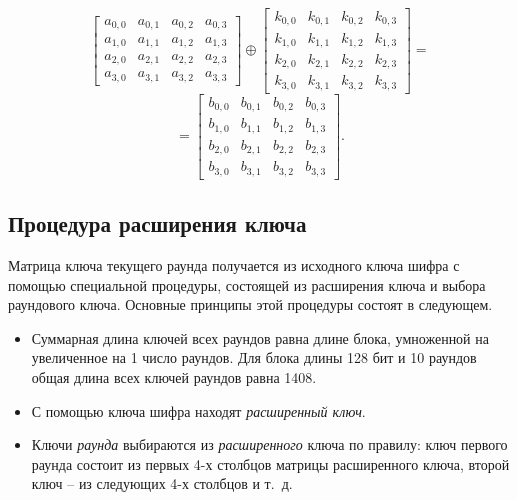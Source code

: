 \[
    \left[ \begin{array}{cccc}
        a_{0,0} & a_{0,1} & a_{0,2} & a_{0,3} \\
        a_{1,0} & a_{1,1} & a_{1,2} & a_{1,3} \\
        a_{2,0} & a_{2,1} & a_{2,2} & a_{2,3} \\
        a_{3,0} & a_{3,1} & a_{3,2} & a_{3,3}
    \end{array} \right]
    \oplus
    \left[ \begin{array}{cccc}
        k_{0,0} & k_{0,1} & k_{0,2} & k_{0,3} \\
        k_{1,0} & k_{1,1} & k_{1,2} & k_{1,3} \\
        k_{2,0} & k_{2,1} & k_{2,2} & k_{2,3} \\
        k_{3,0} & k_{3,1} & k_{3,2} & k_{3,3}
    \end{array} \right] =
\] \[
    = \left[ \begin{array}{cccc}
        b_{0,0} & b_{0,1} & b_{0,2} & b_{0,3} \\
        b_{1,0} & b_{1,1} & b_{1,2} & b_{1,3} \\
        b_{2,0} & b_{2,1} & b_{2,2} & b_{2,3} \\
        b_{3,0} & b_{3,1} & b_{3,2} & b_{3,3}
    \end{array} \right].
\]


\subsection{Процедура расширения ключа}

Матрица ключа текущего раунда получается из исходного ключа шифра с помощью специальной процедуры, состоящей из расширения ключа и выбора раундового ключа. Основные принципы этой процедуры состоят в следующем.
\begin{itemize}
    \item Суммарная длина ключей всех раундов равна длине блока, умноженной на увеличенное на 1 число раундов. Для блока длины 128 бит и 10 раундов общая длина всех ключей раундов равна 1408.
    \item С помощью ключа шифра находят \textit{расширенный ключ}.
    \item Ключи \emph{раунда} выбираются из \emph{расширенного} ключа по правилу: ключ первого раунда состоит из первых 4-х столбцов матрицы расширенного ключа, второй ключ -- из следующих 4-х столбцов и т.~д.
\end{itemize}

